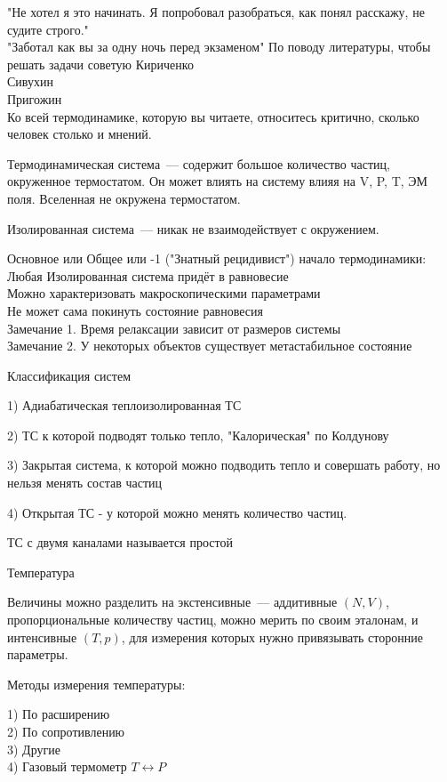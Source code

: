 \documentclass[../main.tex]{subfiles}
\begin{document}
    "Не хотел я это начинать. Я попробовал разобраться, как понял расскажу, не судите строго."\\
    "Заботал как вы за одну ночь перед экзаменом"
    По поводу литературы,
    чтобы решать задачи советую Кириченко\\
    Сивухин\\
    Пригожин\\
    Ко всей термодинамике, которую вы читаете, относитесь критично, сколько человек
    столько и мнений.

    Термодинамическая система~--- содержит большое количество частиц, окруженное термостатом. 
    Он может влиять на систему влияя на V, P, T, ЭМ поля. Вселенная не окружена термостатом.

    Изолированная система~--- никак не взаимодействует с окружением.

    Основное или Общее или -1 ("Знатный рецидивист") начало термодинамики:\\
        Любая Изолированная система придёт в равновесие\\
        Можно характеризовать макроскопическими параметрами\\
        Не может сама покинуть состояние равновесия\\
    Замечание 1. Время релаксации зависит от размеров системы\\
    Замечание 2. У некоторых объектов существует метастабильное состояние

    Классификация систем

        1) Адиабатическая теплоизолированная ТС

        2) ТС к которой подводят только тепло, "Калорическая" по Колдунову

        3) Закрытая система, к которой можно подводить тепло и совершать работу, но
        нельзя менять состав частиц

        4) Открытая ТС - у которой можно менять количество частиц.

        ТС с двумя каналами называется простой

    Температура
    
    Величины можно разделить на экстенсивные~--- аддитивные $(N, V)$, пропорциональные количеству частиц, можно мерить по своим эталонам,
    и интенсивные $(T, p)$, для измерения которых нужно привязывать сторонние параметры.

    Методы измерения температуры:
    
        1) По расширению\\
        2) По сопротивлению\\
        3) Другие\\
        4) Газовый термометр $T \leftrightarrow P$
\end{document}
